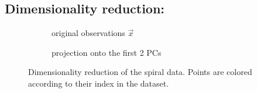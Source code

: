 

\begin{frame}


\section{Dimensionality reduction:}


\begin{figure}[ht]
     \centering
     \begin{subfigure}[t]{0.4\textwidth}
         \centering
         \usebox{\imagebox}%
         \caption{original observations $\vec x$}
         \label{fig:spiral_data}
     \end{subfigure}
     \hfill
     \begin{subfigure}[t]{0.35\textwidth}
         \centering
         \caption{projection onto the first 2 PCs}
         \label{fig:spiral_pca}
     \end{subfigure}
     \caption{Dimensionality reduction of the spiral data. Points are colored according to their index in the dataset.}
	 \label{fig:spiral}
\end{figure}

\end{frame}
